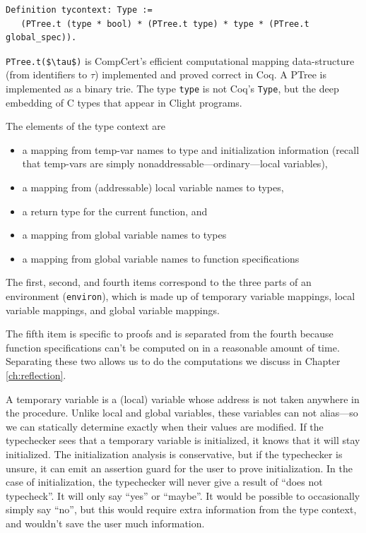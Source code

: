 \documentclass{puthesis}
\begin{document}
\begin{lstlisting}
Definition tycontext: Type :=
   (PTree.t (type * bool) * (PTree.t type) * type * (PTree.t global_spec)).
\end{lstlisting}
\lstinline|PTree.t($\tau$)| is CompCert's efficient computational mapping
data-structure (from identifiers to $\tau$) implemented and proved
correct in Coq. A PTree is implemented as a binary trie. The type
\lstinline|type| is not Coq's \lstinline|Type|, but the deep embedding
of C types that appear in Clight programs.

The elements of the type context are
\begin{itemize}
  \item a mapping from temp-var names to type and initialization
  information (recall that temp-vars are simply nonaddressable---ordinary---local variables),
  \item a mapping from (addressable) local variable names to types,
  \item a return type for the current function, and
  \item a mapping from global variable names to types
  \item a mapping from global variable names to function specifications
\end{itemize}

The first, second, and fourth items correspond to the three parts of
an environment (\lstinline|environ|), which is made up of temporary
variable mappings, local variable mappings, and global variable
mappings.

The fifth item is specific to proofs and is separated from the fourth
because function specifications can't be computed on in a reasonable
amount of time. Separating these two allows us to do the computations
we discuss in Chapter \ref{ch:reflection}. 

A temporary variable is a (local) variable whose address is not taken
anywhere in the procedure.  Unlike local and global variables, these
variables can not alias---so we can statically determine exactly when
their values are modified. If the typechecker sees that a temporary
variable is initialized, it knows that it will stay initialized. The
initialization analysis is conservative, but if the typechecker is
unsure, it can emit an assertion guard for the user to prove
initialization. In the case of initialization, the typechecker will
never give a result of ``does not typecheck''. It will only say
``yes'' or ``maybe''. It would be possible to occasionally simply say
``no'', but this would require extra information from the type
context, and wouldn't save the user much information. 
\end{document}
